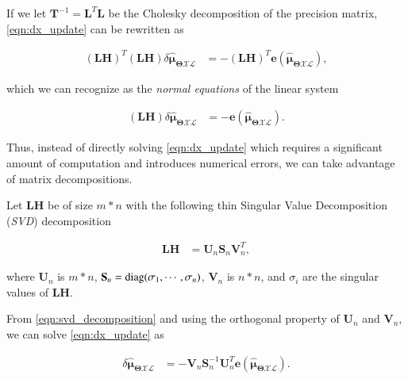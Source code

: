 If we let $\mathbf{T}^{-1}=\mathbf{L}^T\mathbf{L}$ be the Cholesky
decomposition of the precision matrix, \eqref{eqn:dx_update} can be rewritten as

\begin{equation}\label{eqn:dx_update_normal}
  \begin{aligned}
  (\mathbf{L}\mathbf{H})^T(\mathbf{L}\mathbf{H})
    \delta\hat{\boldsymbol{\mu}}_{\boldsymbol{\Theta}\mathcal{X}\mathcal{L}} &= 
    -(\mathbf{L}\mathbf{H})^T\mathbf{e}(\mathbf{\hat{\boldsymbol{\mu}}_{
    \boldsymbol{\Theta}\mathcal{X}\mathcal{L}}}),
  \end{aligned}
\end{equation}

which we can recognize as the \emph{normal equations} of the linear system

\begin{equation}\label{eqn:dx_update_standard}
  \begin{aligned}
  (\mathbf{L}\mathbf{H})
    \delta\hat{\boldsymbol{\mu}}_{\boldsymbol{\Theta}\mathcal{X}\mathcal{L}} &=
    -\mathbf{e}(
    \mathbf{\hat{\boldsymbol{\mu}}_{
    \boldsymbol{\Theta}\mathcal{X}\mathcal{L}}}).
  \end{aligned}
\end{equation}

Thus, instead of directly solving \eqref{eqn:dx_update} which requires a
significant amount of computation and introduces numerical errors, we can take
advantage of matrix decompositions.

Let $\mathbf{L}\mathbf{H}$ be of size $m*n$ with the following thin
Singular Value Decomposition (\emph{SVD}) decomposition

\begin{equation}\label{eqn:svd_decomposition}
  \begin{aligned}
  \mathbf{L}\mathbf{H} &= \mathbf{U}_n\mathbf{S}_n\mathbf{V}_n^T,
  \end{aligned}
\end{equation}

where $\mathbf{U}_n$ is $m*n$, $\mathbf{S}_n=\operatorname{diag}(\sigma_1, \cdots, \sigma_n)$,
$\mathbf{V}_n$ is $n*n$, and $\sigma_i$ are the singular values of
$\mathbf{L}\mathbf{H}$.

From \eqref{eqn:svd_decomposition} and using the orthogonal property of
$\mathbf{U}_n$ and $\mathbf{V}_n$, we can solve \eqref{eqn:dx_update} as

\begin{equation}\label{eqn:dx_svd_solve}
  \begin{aligned}
  \delta\hat{\boldsymbol{\mu}}_{\boldsymbol{\Theta}\mathcal{X}\mathcal{L}} &=
    -\mathbf{V}_n\mathbf{S}_n^{-1}\mathbf{U}_n^T
    \mathbf{e}(
    \mathbf{\hat{\boldsymbol{\mu}}_{
    \boldsymbol{\Theta}\mathcal{X}\mathcal{L}}}).
  \end{aligned}
\end{equation}


